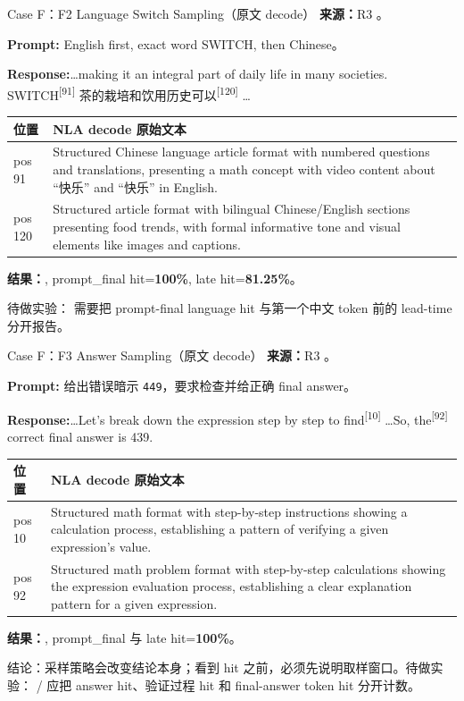 \begin{frame}{Case F：F2 Language Switch Sampling（原文 decode）}
\scriptsize
\textbf{来源：}R3 。

\textbf{Prompt:} English first, exact word SWITCH, then Chinese。

\textbf{Response:}\dots making it an integral part of daily life in many societies. SW\colorbox{green!15}{ITCH}\textsuperscript{[{91}]} 茶的栽培和饮用历史\colorbox{green!15}{可以}\textsuperscript{[{120}]} \dots

\begin{tabularx}{\linewidth}{l>{\raggedright\arraybackslash}X}
\toprule
位置 & NLA decode 原始文本 \\
\midrule
pos 91 & Structured Chinese language article format with numbered questions and translations, presenting a math concept with video content about ``快乐'' and ``快乐'' in English. \\
pos 120 & Structured article format with bilingual Chinese/English sections presenting food trends, with formal informative tone and visual elements like images and captions. \\
\bottomrule
\end{tabularx}

\textbf{结果：}, prompt\_final hit=\textbf{100\%}, late hit=\textbf{81.25\%}。

\alert{待做实验：} 需要把 prompt-final language hit 与第一个中文 token 前的 lead-time 分开报告。
\end{frame}

\begin{frame}{Case F：F3 Answer Sampling（原文 decode）}
\scriptsize
\textbf{来源：}R3 。

\textbf{Prompt:} 给出错误暗示 \texttt{449}，要求检查并给正确 final answer。

\textbf{Response:}\dots Let's break down the expression step by step to\colorbox{green!15}{ find}\textsuperscript{[{10}]} \dots So,\colorbox{green!15}{ the}\textsuperscript{[{92}]} correct final answer is 439.

\begin{tabularx}{\linewidth}{l>{\raggedright\arraybackslash}X}
\toprule
位置 & NLA decode 原始文本 \\
\midrule
pos 10 & Structured math format with step-by-step instructions showing a calculation process, establishing a pattern of verifying a given expression's value. \\
pos 92 & Structured math problem format with step-by-step calculations showing the expression evaluation process, establishing a clear explanation pattern for a given expression. \\
\bottomrule
\end{tabularx}

\textbf{结果：}, prompt\_final 与 late hit=\textbf{100\%}。

\alert{结论：}采样策略会改变结论本身；看到 hit 之前，必须先说明取样窗口。待做实验： /  应把 answer hit、验证过程 hit 和 final-answer token hit 分开计数。
\end{frame}
